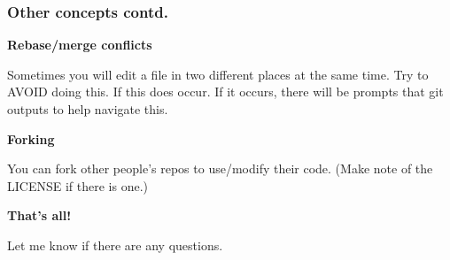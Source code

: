 \documentclass{beamer}
\begin{document}
\begin{frame}
\frametitle{Other concepts contd.}

\textbf{Rebase/merge conflicts}

Sometimes you will edit a file in two different places at the same time. Try to AVOID doing this. If this does occur. If it occurs, there will be prompts that git outputs to help navigate this.

\textbf{Forking}

You can fork other people's repos to use/modify their code. (Make note of the LICENSE if there is one.)

\end{frame}

\begin{frame}
\centering
\huge \textbf{That's all!}

\normalsize Let me know if there are any questions.

\end{frame}
\end{document}
